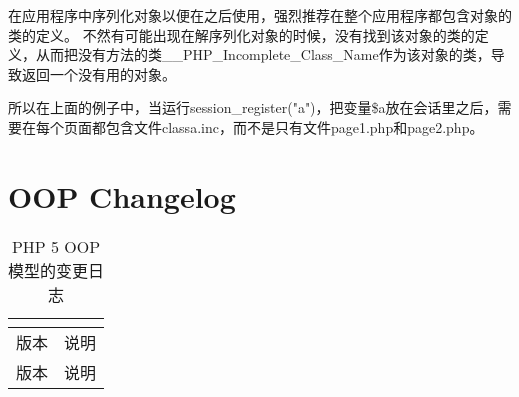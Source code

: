 在应用程序中序列化对象以便在之后使用，强烈推荐在整个应用程序都包含对象的类的定义。 不然有可能出现在解序列化对象的时候，没有找到该对象的类的定义，从而把没有方法的类\_\_PHP\_Incomplete\_Class\_Name作为该对象的类，导致返回一个没有用的对象。

所以在上面的例子中，当运行session\_register("a")，把变量\$a放在会话里之后，需要在每个页面都包含文件classa.inc，而不是只有文件page1.php和page2.php。


\chapter{OOP Changelog}


\begin{longtable}{|m{30pt}|m{350pt}|}
\multicolumn{2}{r}{}
\tabularnewline\hline
版本	&说明
\endhead

\caption{PHP 5 OOP 模型的变更日志}\\
\hline
版本	&说明
\endfirsthead

\multicolumn{2}{r}{}
\endfoot


\end{longtable}
